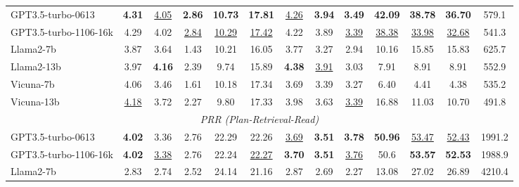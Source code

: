 \documentclass[11pt]{article}
\begin{document}
\begin{table}[h]
{\begin{tabular}{@{}lcccccccccccc@{}}
\multicolumn{1}{l|}{GPT3.5-turbo-0613} & \multicolumn{1}{c}{\textbf{4.31}} & \underline{4.05} & \multicolumn{1}{c|}{\textbf{2.86}} & \textbf{10.73} & \textbf{17.81} & \underline{4.26}& \textbf{3.94}& \multicolumn{1}{c|}{\textbf{3.49}} & \textbf{42.09} & \textbf{38.78} & \multicolumn{1}{c|}{\textbf{36.70}} & 579.1 \\
\multicolumn{1}{l|}{GPT3.5-turbo-1106-16k} & \multicolumn{1}{c}{4.29} & 4.02 & \multicolumn{1}{c|}{\underline{2.84}} & \underline{10.29} & \underline{17.42} & 4.22 & 3.89 & \multicolumn{1}{c|}{\underline{3.39}} & \underline{38.38} & \underline{33.98} & \multicolumn{1}{c|}{\underline{32.68}} & 541.3 \\
\multicolumn{1}{l|}{Llama2-7b} & \multicolumn{1}{c}{3.87} & 3.64 & \multicolumn{1}{c|}{1.43} & 10.21 & 16.05 & 3.77 & 3.27 & \multicolumn{1}{c|}{2.94} & 10.16 & 15.85 & \multicolumn{1}{c|}{15.83} & 625.7 \\
\multicolumn{1}{l|}{Llama2-13b} & \multicolumn{1}{c}{3.97} & \textbf{4.16}& \multicolumn{1}{c|}{2.39} & 9.74 & 15.89 & \textbf{4.38} & \underline{3.91} & \multicolumn{1}{c|}{3.03} & 7.91 & 8.91 & \multicolumn{1}{c|}{8.91} & 552.9 \\
\multicolumn{1}{l|}{Vicuna-7b} & \multicolumn{1}{c}{4.06} & 3.46 & \multicolumn{1}{c|}{1.61} & 10.18 & 17.34 & 3.69 & 3.39 & \multicolumn{1}{c|}{3.27} & 6.40 & 4.41 & \multicolumn{1}{c|}{4.38} & 535.2 \\ 
\multicolumn{1}{l|}{Vicuna-13b} & \multicolumn{1}{c}{\underline{4.18}} & 3.72 & \multicolumn{1}{c|}{2.27} & 9.80 & 17.33 & 3.98 & 3.63 & \multicolumn{1}{c|}{\underline{3.39}} & 16.88 & 11.03 & \multicolumn{1}{c|}{10.70} & 491.8 \\ \midrule 
\multicolumn{13}{c}{\textit{PRR (Plan-Retrieval-Read)}} \\ \midrule
\multicolumn{1}{l|}{GPT3.5-turbo-0613} & \multicolumn{1}{c}{\textbf{4.02}} & 3.36 & \multicolumn{1}{c|}{2.76} & 22.29 & 22.26 & \underline{3.69} & \textbf{3.51} & \multicolumn{1}{c|}{\textbf{3.78}} & \textbf{50.96} & \underline{53.47} & \multicolumn{1}{c|}{\underline{52.43}} & 1991.2 \\
\multicolumn{1}{l|}{GPT3.5-turbo-1106-16k} & \multicolumn{1}{c}{\textbf{4.02}} & \underline{3.38}& \multicolumn{1}{c|}{2.76} & 22.24& \underline{22.27}& \textbf{3.70} & \textbf{3.51} & \multicolumn{1}{c|}{\underline{3.76}} & 50.6 & \textbf{53.57} & \multicolumn{1}{c|}{\textbf{52.53}} & 1988.9 \\
\multicolumn{1}{l|}{Llama2-7b} & \multicolumn{1}{c}{2.83} & 2.74 & \multicolumn{1}{c|}{2.52} & 24.14 & 21.16 & 2.87 & 2.69 & \multicolumn{1}{c|}{2.27} & 13.08 & 27.02 & \multicolumn{1}{c|}{26.89} & 4210.4 \\

\end{tabular}}
\end{table}
\end{document}
